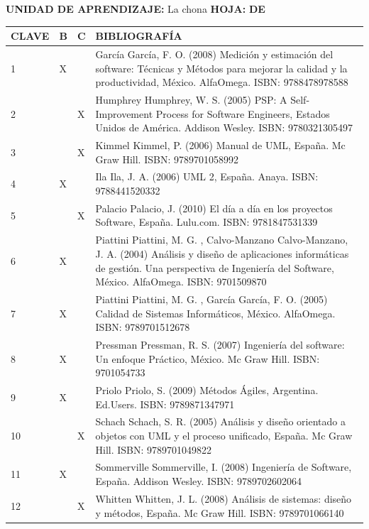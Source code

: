 \documentclass[10pt]{article}
\newcommand\tab[1][1cm]{\hspace*{#1}}
\begin{document}
\textbf{UNIDAD DE APRENDIZAJE:} La chona
\tab[1cm]
\textbf{HOJA: } \thepage
\tab[0.25cm]
\textbf{DE } \pageref{LastPage}\\

\begin{table}[H]
  \begin{tabular}{|p{}|p{}|p{}|p{}|}
    \hline

    \textbf{CLAVE} & \textbf{B} & \textbf{C} & \textbf{BIBLIOGRAFÍA}\\\hline
    1&X &  &García García, F. O. (2008) Medición y estimación del software: Técnicas y Métodos para mejorar la calidad y la productividad, México. AlfaOmega. ISBN: 9788478978588\\ 2& & X &Humphrey Humphrey, W. S. (2005) PSP: A Self-Improvement Process for Software Engineers, Estados Unidos de América. Addison Wesley. ISBN: 9780321305497\\ 3& & X &Kimmel Kimmel, P. (2006) Manual de UML, España. Mc Graw Hill. ISBN: 9789701058992\\ 4&X &  &Ila Ila, J. A. (2006) UML 2, España. Anaya. ISBN: 9788441520332\\ 5& & X &Palacio Palacio, J. (2010) El día a día en los proyectos Software, España. Lulu.com. ISBN: 9781847531339\\ 6&X &  &Piattini Piattini, M. G. , Calvo-Manzano Calvo-Manzano, J. A. (2004) Análisis y diseño de aplicaciones informáticas de gestión. Una perspectiva de Ingeniería del Software, México. AlfaOmega. ISBN: 9701509870\\ 7&X &  &Piattini Piattini, M. G. , García García, F. O. (2005) Calidad de Sistemas Informáticos, México. AlfaOmega. ISBN: 9789701512678\\ 8&X &  &Pressman Pressman, R. S. (2007) Ingeniería del software: Un enfoque Práctico, México. Mc Graw Hill. ISBN: 9701054733\\ 9&X &  &Priolo Priolo, S. (2009) Métodos Ágiles, Argentina. Ed.Users. ISBN: 9789871347971\\ 10& & X &Schach Schach, S. R. (2005) Análisis y diseño orientado a objetos con UML y el proceso unificado, España. Mc Graw Hill. ISBN: 9789701049822\\ 11&X &  &Sommerville Sommerville, I. (2008) Ingeniería de Software, España. Addison Wesley. ISBN: 9789702602064\\ 12& & X &Whitten Whitten, J. L. (2008) Análisis de sistemas: diseño y métodos, España. Mc Graw Hill. ISBN: 9789701066140\\ 

    \hline
  \end{tabular}
\end{table}
\end{document}
